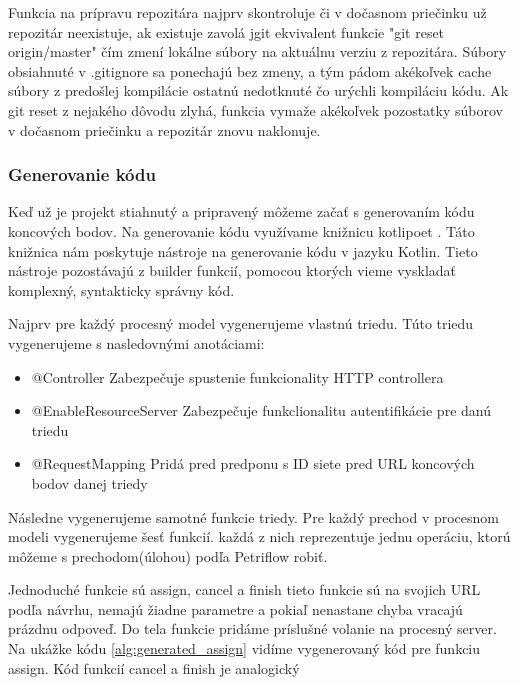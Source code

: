 Funkcia na prípravu repozitára najprv skontroluje či v dočasnom priečinku už repozitár neexistuje, ak existuje zavolá jgit ekvivalent funkcie "git reset origin/master" čím zmení lokálne súbory na aktuálnu verziu z repozitára. Súbory obsiahnuté v .gitignore sa ponechajú bez zmeny, a tým pádom akékoľvek cache súbory z predošlej kompilácie ostatnú nedotknuté čo urýchli kompiláciu kódu. Ak git reset z nejakého dôvodu zlyhá, funkcia vymaže akékoľvek pozostatky súborov v dočasnom priečinku a repozitár znovu naklonuje. 



\subsubsection{Generovanie kódu} 
Keď už je projekt stiahnutý a pripravený môžeme začať s generovaním kódu koncových bodov. Na generovanie kódu  využívame knižnicu kotlipoet \cite{kotlipoet}. Táto knižnica nám poskytuje nástroje na generovanie kódu v jazyku Kotlin. Tieto nástroje pozostávajú z builder funkcií, pomocou ktorých vieme vyskladať komplexný, syntakticky správny kód. 



Najprv pre každý procesný model vygenerujeme vlastnú triedu. Túto triedu vygenerujeme s nasledovnými anotáciami: 

\begin{itemize} 
	
	\item @Controller Zabezpečuje spustenie funkcionality HTTP controllera  
	
	\item @EnableResourceServer Zabezpečuje funkclionalitu autentifikácie pre danú triedu 
	
	\item @RequestMapping Pridá pred predponu s ID siete pred URL koncových bodov danej triedy 
	
\end{itemize} 

Následne vygenerujeme samotné funkcie triedy. Pre každý prechod v procesnom modeli vygenerujeme šesť funkcií. každá z nich reprezentuje jednu operáciu, ktorú môžeme s prechodom(úlohou) podľa Petriflow robiť.  

Jednoduché funkcie sú assign, cancel a finish tieto funkcie sú na svojich URL podľa návrhu, nemajú žiadne parametre a pokiaľ nenastane chyba vracajú prázdnu odpoveď. Do tela funkcie pridáme príslušné volanie na procesný server. Na ukážke kódu \ref{alg:generated_assign} vidíme vygenerovaný kód pre funkciu assign. Kód funkcií cancel a finish je analogický  




